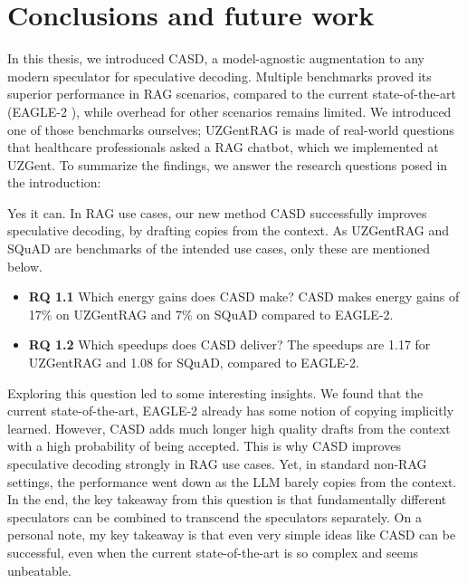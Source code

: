 
\chapter{Conclusions and future work}
\label{sec:conclusion_future_work}

In this thesis, we introduced CASD, a model-agnostic augmentation to any modern speculator for speculative decoding. Multiple benchmarks proved its superior performance in RAG scenarios, compared to the current state-of-the-art (EAGLE-2 \cite{li2024eagle}), while overhead for other scenarios remains limited. We introduced one of those benchmarks ourselves; UZGentRAG is made of real-world questions that healthcare professionals asked a RAG chatbot, which we implemented at UZGent. To summarize the findings, we answer the research questions posed in the introduction:

\begin{tcolorbox}[colback=blue-ish-light,colframe=blue-ish,title=\textbf{RQ1:} {{Can a new speculative decoding strategy be designed, relying on the repetition of phrases in prompt and answer, resulting in increased inference efficiency of LLMs?}}, coltitle=white]
    Yes it can. In RAG use cases, our new method CASD successfully improves speculative decoding, by drafting copies from the context. As UZGentRAG and SQuAD \cite{rajpurkar2016squad} are benchmarks of the intended use cases, only these are mentioned below.
    \begin{itemize}
        \item \textbf{RQ 1.1} Which energy gains does CASD make? CASD makes energy gains of 17\% on UZGentRAG and 7\% on SQuAD compared to EAGLE-2.
        \item \textbf{RQ 1.2} Which speedups does CASD deliver? The speedups are 1.17 for UZGentRAG and 1.08 for SQuAD, compared to EAGLE-2.
    \end{itemize}
\end{tcolorbox}

Exploring this question led to some interesting insights. We found that the current state-of-the-art, EAGLE-2 already has some notion of copying implicitly learned. However, CASD adds much longer high quality drafts from the context with a high probability of being accepted. This is why CASD improves speculative decoding strongly in RAG use cases. Yet, in standard non-RAG settings, the performance went down as the LLM barely copies from the context. In the end, the key takeaway from this question is that fundamentally different speculators can be combined to transcend the speculators separately. On a personal note, my key takeaway is that even very simple ideas like CASD can be successful, even when the current state-of-the-art is so complex and seems unbeatable. 

